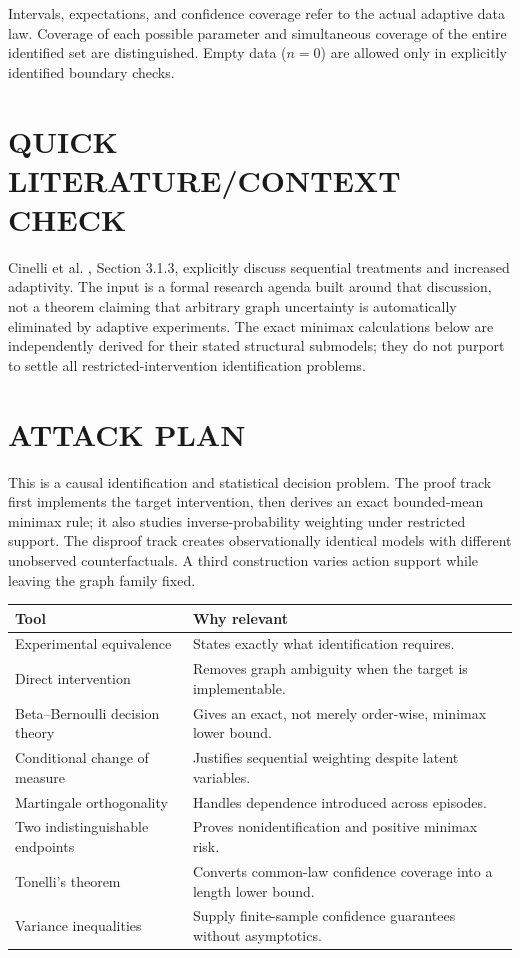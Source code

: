 \documentclass[11pt,a4paper]{article}
\theoremstyle{remark}\newtheorem{remark}[theorem]{Remark}
\begin{document}
Intervals, expectations, and confidence coverage refer to the actual adaptive data law. Coverage of each possible parameter and simultaneous coverage of the entire identified set are distinguished. Empty data ($n=0$) are allowed only in explicitly identified boundary checks.

\section{QUICK LITERATURE/CONTEXT CHECK}
Cinelli et al. \cite{causal}, Section 3.1.3, explicitly discuss sequential treatments and increased adaptivity. The input is a formal research agenda built around that discussion, not a theorem claiming that arbitrary graph uncertainty is automatically eliminated by adaptive experiments. The exact minimax calculations below are independently derived for their stated structural submodels; they do not purport to settle all restricted-intervention identification problems.

\section{ATTACK PLAN}
This is a causal identification and statistical decision problem. The proof track first implements the target intervention, then derives an exact bounded-mean minimax rule; it also studies inverse-probability weighting under restricted support. The disproof track creates observationally identical models with different unobserved counterfactuals. A third construction varies action support while leaving the graph family fixed.

\begin{center}\begin{tabular}{p{.24\linewidth}p{.67\linewidth}}\toprule Tool&Why relevant\\\midrule
Experimental equivalence&States exactly what identification requires.\\
Direct intervention&Removes graph ambiguity when the target is implementable.\\
Beta--Bernoulli decision theory&Gives an exact, not merely order-wise, minimax lower bound.\\
Conditional change of measure&Justifies sequential weighting despite latent variables.\\
Martingale orthogonality&Handles dependence introduced across episodes.\\
Two indistinguishable endpoints&Proves nonidentification and positive minimax risk.\\
Tonelli's theorem&Converts common-law confidence coverage into a length lower bound.\\
Variance inequalities&Supply finite-sample confidence guarantees without asymptotics.\\\bottomrule
\end{tabular}\end{center}
\end{document}

